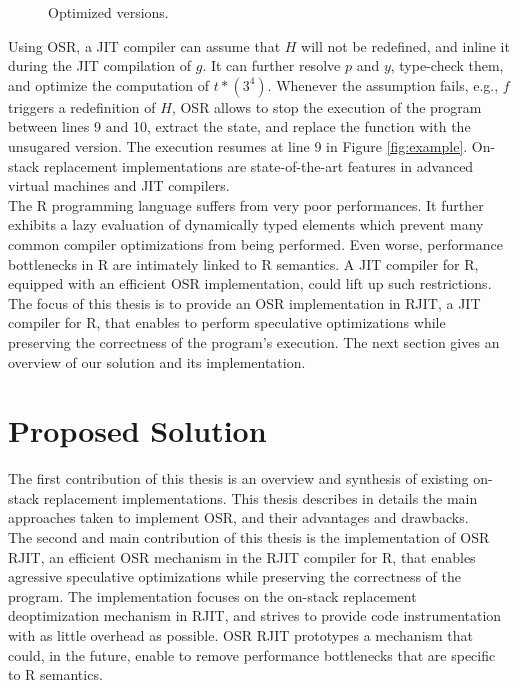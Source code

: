 \begin{wrapfigure}[12]{l}{6.5cm}
\caption{Optimized versions.}
\end{wrapfigure}
Using OSR, a JIT compiler can assume that $H$ will not be redefined, and inline it during the JIT compilation of $g$.
It can further resolve $p$ and $y$, type-check them, and optimize the computation of $t * (3 ^ 4)$.
Whenever the assumption fails, e.g., $f$ triggers a redefinition of $H$, OSR allows to stop the execution of the program between lines 9 and 10, extract the state, and replace the function with the unsugared version.
The execution resumes at line 9 in Figure \ref{fig:example}.
On-stack replacement implementations are state-of-the-art features in advanced virtual machines and JIT compilers.\\


The R programming language suffers from very poor performances. 
It further exhibits a lazy evaluation of dynamically typed elements which prevent many common compiler optimizations from being performed.
Even worse, performance bottlenecks in R are intimately linked to R semantics. 
A JIT compiler for R, equipped with an efficient OSR implementation, could lift up such restrictions.
The focus of this thesis is to provide an OSR implementation in RJIT, a JIT compiler for R, that enables to perform speculative optimizations while preserving the correctness of the program's execution.
The next section gives an overview of our solution and its implementation.\\

\section{Proposed Solution}
The first contribution of this thesis is an overview and synthesis of existing on-stack replacement implementations.
This thesis describes in details the main approaches taken to implement OSR, and their advantages and drawbacks.\\

The second and main contribution of this thesis is the implementation of OSR RJIT, an efficient OSR mechanism in the RJIT compiler for R, that enables agressive speculative optimizations while preserving the correctness of the program.
The implementation focuses on the on-stack replacement deoptimization mechanism in RJIT, and strives to provide code instrumentation with as little overhead as possible.
OSR RJIT prototypes a mechanism that could, in the future, enable to remove performance bottlenecks that are specific to R semantics.\\

